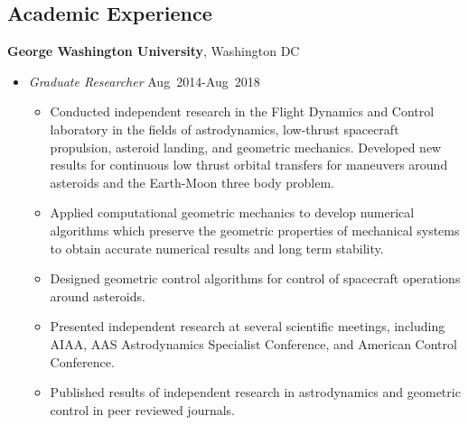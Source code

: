 
\subsection*{Academic Experience}
{}

\textbf{George Washington University}, Washington DC
    \begin{itemize}
        \item[] \textit{Graduate Researcher} \hfill {Aug~2014-Aug~2018}
        \begin{itemize}
            \item Conducted independent research in the Flight Dynamics and Control laboratory in the fields of astrodynamics, low-thrust spacecraft propulsion, asteroid landing, and geometric mechanics.
            Developed new results for continuous low thrust orbital transfers for maneuvers around asteroids and the Earth-Moon three body problem.
            \item Applied computational geometric mechanics to develop numerical algorithms which preserve the geometric properties of mechanical systems to obtain accurate numerical results and long term stability.
            \item Designed geometric control algorithms for control of spacecraft operations around asteroids.
        \item Presented independent research at several scientific meetings, including AIAA, AAS Astrodynamics Specialist Conference, and American Control Conference.
        \item Published results of independent research in astrodynamics and geometric control in peer reviewed journals.

\end{itemize}
\end{itemize}
